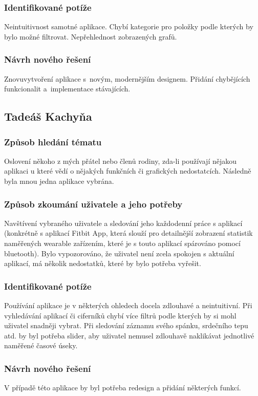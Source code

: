 \documentclass[12pt, titlepage]{article}
\begin{document}
	\subsubsection{Identifikované potíže}
Neintuitivnost samotné aplikace. Chybí kategorie pro položky podle kterých by bylo možné filtrovat. Nepřehlednost zobrazených grafů.

	\subsubsection{Návrh nového řešení}
Znovuvytvoření aplikace s~novým, modernějším designem. Přidání chybějících funkcionalit a~implementace stávajících.



\subsection{Tadeáš Kachyňa}
	\subsubsection{Způsob hledání tématu}
Oslovení někoho z mých přátel nebo členů rodiny, zda-li používají nějakou aplikaci u které vědí o nějakých funkčních či grafických nedostatcích. Následně byla mnou jedna aplikace vybrána. 

	\subsubsection{Způsob zkoumání uživatele a jeho potřeby}
Navštívení vybraného uživatele a sledování jeho každodenní práce s aplikací (konkrétně s aplikací Fitbit App, která slouží pro detailnější zobrazení statistik naměřených wearable zařízením, které je s touto aplikací spárováno pomocí bluetooth). Bylo vypozorováno, že uživatel není zcela spokojen s aktuální aplikací, má několik nedostatků, které by bylo potřeba vyřešit.

	\subsubsection{Identifikované potíže}
Používání aplikace je v některých ohledech docela zdlouhavé a neintuitivní. Při vyhledávání aplikací či ciferníků chybí více filtrů podle kterých by si mohl uživatel snadněji vybrat. Při sledování záznamu svého spánku, srdečního tepu atd. by byl potřeba slider, aby uživatel nemusel zdlouhavě naklikávat jednotlivé naměřené časové úseky.  

	\subsubsection{Návrh nového řešení}
V případě této aplikace by byl potřeba redesign a přidání některých funkcí. 
\end{document}

